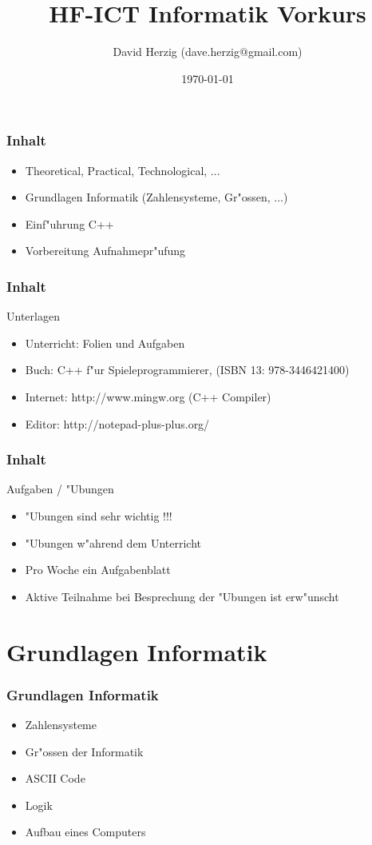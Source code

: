 \documentclass{beamer}
\title{HF-ICT Informatik Vorkurs}
\author{David Herzig (dave.herzig@gmail.com)}
\date{\today}
\begin{document}
\frame{\titlepage}

\setcounter{tocdepth}{1}

\frame
{
	\frametitle{Inhalt}
	\begin{itemize}
	\item Theoretical, Practical, Technological, ...
	\item Grundlagen Informatik (Zahlensysteme, Gr"ossen, ...)
	\item Einf"uhrung C++
	\item Vorbereitung Aufnahmepr"ufung
	\end{itemize}
}

\frame
{
	\frametitle{Inhalt}
	Unterlagen
	\begin{itemize}
	\item Unterricht: Folien und Aufgaben
	\item Buch: C++ f"ur Spieleprogrammierer, (ISBN 13: 978-3446421400)
	\item Internet: http://www.mingw.org (C++ Compiler)
	\item Editor: http://notepad-plus-plus.org/
	\end{itemize}
}

\frame
{
	\frametitle{Inhalt}
	Aufgaben / "Ubungen
	\begin{itemize}
	\item "Ubungen sind sehr wichtig !!!
	\item "Ubungen w"ahrend dem Unterricht
	\item Pro Woche ein Aufgabenblatt
	\item Aktive Teilnahme bei Besprechung der "Ubungen ist erw"unscht
	\end{itemize}
}

\section{Grundlagen Informatik}
\frame
{
	\frametitle{Grundlagen Informatik}
	\begin{itemize}
	\item Zahlensysteme
	\item Gr"ossen der Informatik
	\item ASCII Code
	\item Logik
	\item Aufbau eines Computers
	\end{itemize}
}
\end{document}
